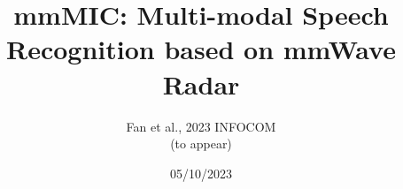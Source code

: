 \documentclass[dvipsnames, handout]{beamer}
\newcommand{\1}{\mathds{1}}	%
\begin{document}


\title{mmMIC: Multi-modal Speech Recognition based on mmWave Radar}

\author{Fan et al., 2023 INFOCOM \\(to appear)\vspace{-.3cm}}

\date{05/10/2023}

\begin{frame}
\titlepage
\vspace{-1.2cm}
\begin{center}
\end{center}
\end{frame}

\end{document}

